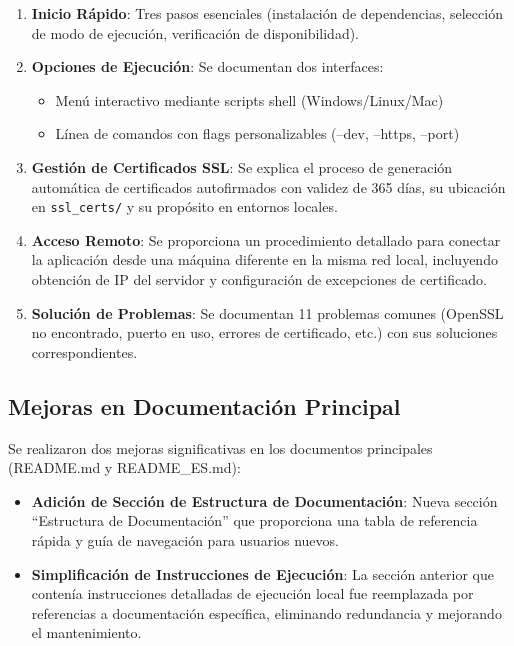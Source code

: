 \documentclass[12pt,a4paper]{article}
\begin{document}
\begin{enumerate}
    \item \textbf{Inicio Rápido}: Tres pasos esenciales (instalación de dependencias, selección de modo de ejecución, verificación de disponibilidad).
    
    \item \textbf{Opciones de Ejecución}: Se documentan dos interfaces:
    \begin{itemize}
        \item Menú interactivo mediante scripts shell (Windows/Linux/Mac)
        \item Línea de comandos con flags personalizables (--dev, --https, --port)
    \end{itemize}
    
    \item \textbf{Gestión de Certificados SSL}: Se explica el proceso de generación automática de certificados autofirmados con validez de 365 días, su ubicación en \texttt{ssl\_certs/} y su propósito en entornos locales.
    
    \item \textbf{Acceso Remoto}: Se proporciona un procedimiento detallado para conectar la aplicación desde una máquina diferente en la misma red local, incluyendo obtención de IP del servidor y configuración de excepciones de certificado.
    
    \item \textbf{Solución de Problemas}: Se documentan 11 problemas comunes (OpenSSL no encontrado, puerto en uso, errores de certificado, etc.) con sus soluciones correspondientes.
\end{enumerate}

\subsection{Mejoras en Documentación Principal}

Se realizaron dos mejoras significativas en los documentos principales (README.md y README\_ES.md):

\begin{itemize}
    \item \textbf{Adición de Sección de Estructura de Documentación}: Nueva sección ``Estructura de Documentación'' que proporciona una tabla de referencia rápida y guía de navegación para usuarios nuevos.
    
    \item \textbf{Simplificación de Instrucciones de Ejecución}: La sección anterior que contenía instrucciones detalladas de ejecución local fue reemplazada por referencias a documentación específica, eliminando redundancia y mejorando el mantenimiento.
\end{itemize}
\end{document}
